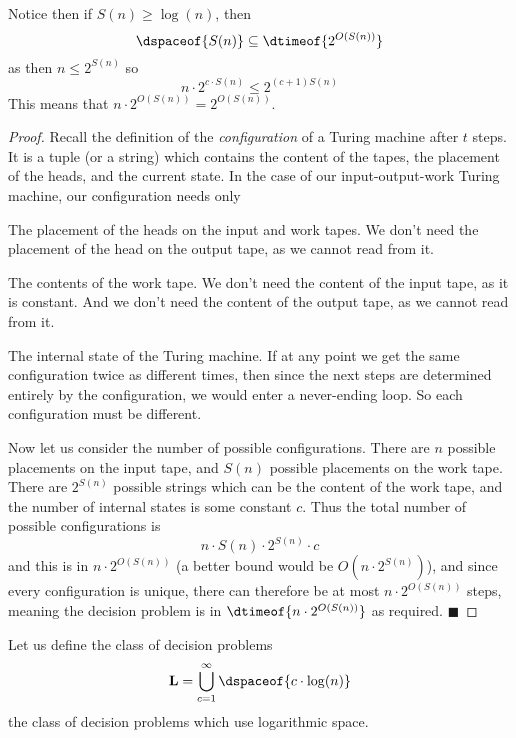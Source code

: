 \documentclass[10pt]{article}
\def\L{\mathbf{L}}
\def\qed{%
    \ifmmode%
        \eqno\blacksquare%
    \else%
        \hskip1cm\allowbreak\hbox{}\nobreak\hfill$\blacksquare$%
    \fi%
}
\begin{document}
Notice then if $S(n)\geq\log(n)$, then
\[ \dspaceof{S(n)} \subseteq \dtimeof{2^{O(S(n))}} \]
as then $n\leq 2^{S(n)}$ so
\[ n\cdot2^{c\cdot S(n)} \leq 2^{(c+1)S(n)} \]
This means that $n\cdot2^{O(S(n))}=2^{O(S(n))}$.

\begin{proof}

    Recall the definition of the \emph{configuration} of a Turing machine after $t$ steps.
    It is a tuple (or a string) which contains the content of the tapes, the placement of the heads, and the current state.
    In the case of our input-output-work Turing machine, our configuration needs only
    \benum
        \item The placement of the heads on the input and work tapes.
        We don't need the placement of the head on the output tape, as we cannot read from it.
        \item The contents of the work tape.
        We don't need the content of the input tape, as it is constant.
        And we don't need the content of the output tape, as we cannot read from it.
        \item The internal state of the Turing machine.
    \eenum
    If at any point we get the same configuration twice as different times, then since the next steps are determined entirely by the configuration, we would enter a never-ending loop.
    So each configuration must be different.

    Now let us consider the number of possible configurations.
    There are $n$ possible placements on the input tape, and $S(n)$ possible placements on the work tape.
    There are $2^{S(n)}$ possible strings which can be the content of the work tape, and the number of internal states is some constant $c$.
    Thus the total number of possible configurations is
    \[ n\cdot S(n)\cdot2^{S(n)}\cdot c \]
    and this is in $n\cdot2^{O(S(n))}$ (a better bound would be $O(n\cdot2^{S(n)})$), and since every configuration is unique, there can therefore be at most $n\cdot2^{O(S(n))}$ steps, meaning the decision
    problem is in $\dtimeof{n\cdot2^{O(S(n))}}$ as required.
    \qed

\end{proof}

\begin{defn*}

    Let us define the class of decision problems
    \[ \L = \bigcup_{c=1}^\infty \dspaceof{c\cdot\log(n)} \]
    the class of decision problems which use logarithmic space.

\end{defn*}
\end{document}

